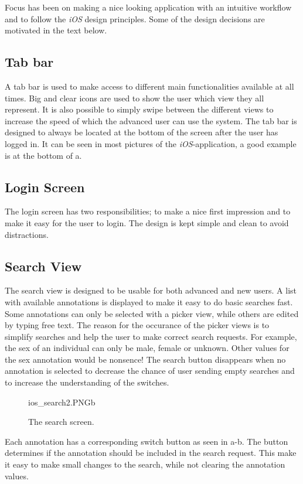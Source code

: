 Focus has been on making a nice looking application with an intuitive workflow and to follow the \textit{iOS} design principles. Some of the design decisions are motivated in the text below.

\subsection{Tab bar}
A tab bar is used to make access to different main functionalities available at all times. Big and clear icons are used to show the user which view they all represent. It is also possible to simply swipe between the different views to increase the speed of which the advanced user can use the system. The tab bar is designed to always be located at the bottom of the screen after the user has logged in. It can be seen in most pictures of the \textit{iOS}-application, a good example is at the bottom of a.

\subsection{Login Screen}
The login screen has two responsibilities; to make a nice first impression and to make it easy for the user to login. The design is kept simple and clean to avoid distractions.

\subsection{Search View}
The search view is designed to be usable for both advanced and new users. A list with available annotations is displayed to make it easy to do basic searches fast. Some annotations can only be selected with a picker view, while others are edited by typing free text. The reason for the occurance of the picker views is to simplify searches and help the user to make correct search requests. For example, the sex of an individual can only be male, female or unknown. Other values for the sex annotation would be nonsence! The search button disappears when no annotation is selected to decrease the chance of user sending empty searches and to increase the understanding of the switches. 

\begin{figure}[ht]
		{ios_search2.PNG}{b}
\caption{\footnotesize The search screen.}
\label{fig:ios_search2}
\end{figure}
\FloatBarrier

Each annotation has a corresponding switch button as seen in a-b. The button determines if the annotation should be included in the search request. This make it easy to make small changes to the search, while not clearing the annotation values.

